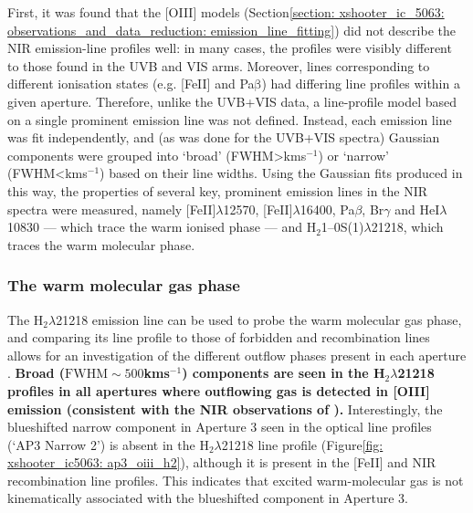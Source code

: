 First, it was found that the [OIII] models (Section\;\ref{section: xshooter_ic_5063: observations_and_data_reduction: emission_line_fitting}) did not describe the NIR emission-line profiles well: in many cases, the profiles were visibly different to those found in the UVB and VIS arms. Moreover, lines corresponding to different ionisation states (e.g. [FeII] and Pa$\mathrm{\beta}$) had differing line profiles within a given aperture. Therefore, unlike the UVB+VIS data, a line-profile model based on a single prominent emission line was not defined. Instead, each emission line was fit independently, and (as was done for the UVB+VIS spectra) Gaussian components were grouped into `broad' (\mbox{FWHM\;\textgreater{}\;km\;s$^{-1}$}) or `narrow' (\mbox{FWHM\;\textless{}\;km\;s$^{-1}$}) based on their line widths. Using the Gaussian fits produced in this way, the properties of several key, prominent emission lines in the NIR spectra were measured, namely [FeII]$\lambda$12570, [FeII]$\lambda$16400, Pa$\beta$, Br$\gamma$ and HeI$\lambda$10830 --- which trace the warm ionised phase --- and H$_2$1--0S(1)$\lambda$21218, which traces the warm molecular phase.

\subsubsection{The warm molecular gas phase}
\label{section: xshooter_ic5063: properties_of_outflowing_gas: nir_analysis_and_results: warm_molecular}

The H$_2 \lambda$21218 emission line can be used to probe the warm molecular gas phase, and comparing its line profile to those of forbidden and recombination lines allows for an investigation of the different outflow phases present in each aperture \citep{Tadhunter2014}. \textbf{Broad ($\mathrm{FWHM}\sim500$\;km\;s$^{-1}$) components are seen in the H$_2 \lambda$21218 profiles in all apertures where outflowing gas is detected in [OIII] emission (consistent with the NIR observations of \citet{Tadhunter2014}).} Interestingly, the blueshifted narrow component in Aperture 3 seen in the optical line profiles (`AP3 Narrow 2') is absent in the H$_2 \lambda$21218 line profile (Figure\;\ref{fig: xshooter_ic5063: ap3_oiii_h2}), although it is present in the [FeII] and NIR recombination line profiles. This indicates that excited warm-molecular gas is not kinematically associated with the blueshifted component in Aperture 3.

